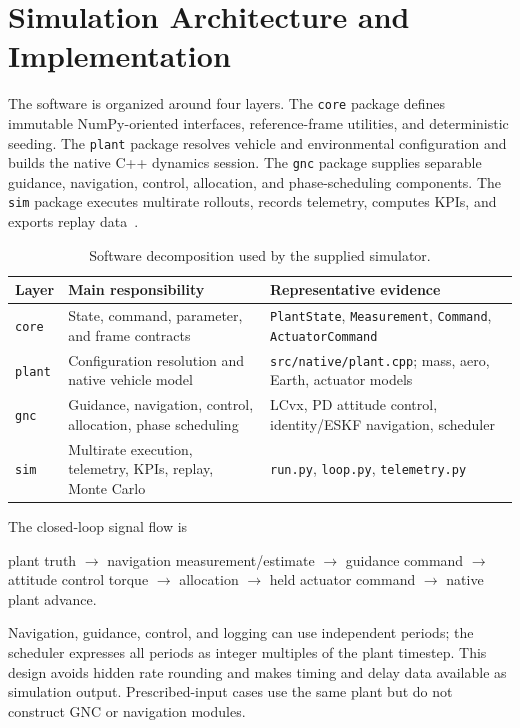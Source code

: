 \documentclass[11pt,letterpaper]{article}
\newcommand{\sourcecode}[1]{\texttt{#1}}
\begin{document}
\section{Simulation Architecture and Implementation}\label{sec:architecture}

The software is organized around four layers. The \sourcecode{core} package defines immutable NumPy-oriented interfaces, reference-frame utilities, and deterministic seeding. The \sourcecode{plant} package resolves vehicle and environmental configuration and builds the native C++ dynamics session. The \sourcecode{gnc} package supplies separable guidance, navigation, control, allocation, and phase-scheduling components. The \sourcecode{sim} package executes multirate rollouts, records telemetry, computes KPIs, and exports replay data~\cite{readme,architecture}.

\begin{table}[H]
\centering
\begin{tabularx}{\textwidth}{p{}YY}
\toprule
{}\color{white}\textbf{Layer} & \color{white}\textbf{Main responsibility} & \color{white}\textbf{Representative evidence}\\
\midrule
\sourcecode{core} & State, command, parameter, and frame contracts & \sourcecode{PlantState}, \sourcecode{Measurement}, \sourcecode{Command}, \sourcecode{ActuatorCommand}\\
\sourcecode{plant} & Configuration resolution and native vehicle model & \sourcecode{src/native/plant.cpp}; mass, aero, Earth, actuator models\\
\sourcecode{gnc} & Guidance, navigation, control, allocation, phase scheduling & LCvx, PD attitude control, identity/ESKF navigation, scheduler\\
\sourcecode{sim} & Multirate execution, telemetry, KPIs, replay, Monte Carlo & \sourcecode{run.py}, \sourcecode{loop.py}, \sourcecode{telemetry.py}\\
\bottomrule
\end{tabularx}
\caption{Software decomposition used by the supplied simulator.}\label{tab:architecture}
\end{table}

The closed-loop signal flow is
\begin{center}
\small
plant truth $\rightarrow$ navigation measurement/estimate $\rightarrow$ guidance command $\rightarrow$ attitude control torque $\rightarrow$ allocation $\rightarrow$ held actuator command $\rightarrow$ native plant advance.
\end{center}
Navigation, guidance, control, and logging can use independent periods; the scheduler expresses all periods as integer multiples of the plant timestep. This design avoids hidden rate rounding and makes timing and delay data available as simulation output. Prescribed-input cases use the same plant but do not construct GNC or navigation modules.
\end{document}
